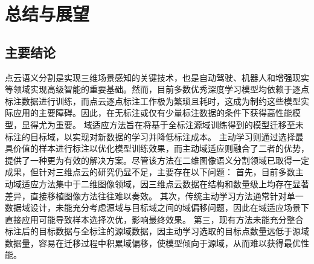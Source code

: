 \chapter{总结与展望}
\thispagestyle{others}
\pagestyle{others}
\xiaosi

\section{主要结论}
点云语义分割是实现三维场景感知的关键技术，也是自动驾驶、机器人和增强现实等领域实现高级智能的重要基础。然而，目前多数优秀深度学习模型均依赖于逐点标注数据进行训练，而点云逐点标注工作极为繁琐且耗时，这成为制约这些模型实际应用的主要障碍。因此，在无标注或仅有少量标注数据的条件下获得高性能模型，显得尤为重要。
域适应方法旨在将基于全标注源域训练得到的模型迁移至未标注的目标域，以实现对新数据的学习并降低标注成本。
主动学习则通过选择最具价值的样本进行标注以优化模型训练效果，而主动域适应则融合了二者的优势，提供了一种更为有效的解决方案。尽管该方法在二维图像语义分割领域已取得一定成果，但针对三维点云的研究仍显不足，主要存在以下问题：
首先，目前多数主动域适应方法集中于二维图像领域，因三维点云数据在结构和数量级上均存在显著差异，直接移植图像方法往往难以奏效。
其次，传统主动学习方法通常针对单一数据域设计，未能充分考虑源域与目标域之间的域偏移问题，因此在域适应场景下直接应用可能导致样本选择次优，影响最终效果。
第三，现有方法未能充分整合标注后的目标数据与全标注的源域数据，因主动学习选取的目标点数量远低于源域数据量，容易在迁移过程中积累域偏移，使模型倾向于源域，从而难以获得最优性能。

